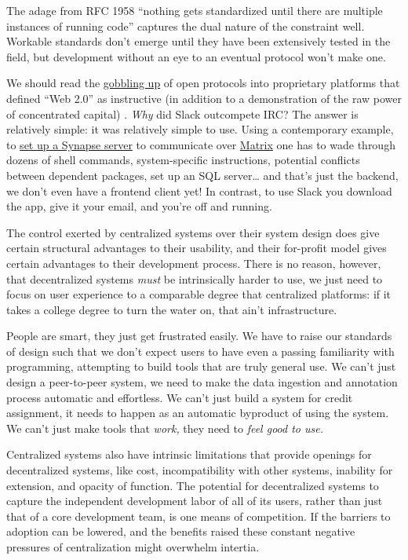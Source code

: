 \documentclass[10pt]{tufte-book}
\begin{document}
The adage from RFC 1958 ``nothing gets standardized until there are
multiple instances of running code'' \citep{carpenterRFC1958Architectural1996}  captures the dual nature of the
constraint well. Workable standards don't emerge until they have been
extensively tested in the field, but development without an eye to an
eventual protocol won't make one.

We should read the
\href{https://en.wikipedia.org/wiki/Embrace,_extend,_and_extinguish}{gobbling
up} of open protocols into proprietary platforms that defined ``Web
2.0'' as instructive (in addition to a demonstration of the raw power of
concentrated capital) \citep{markoffTomorrowWorldWide1996} .
\emph{Why} did Slack outcompete IRC? The answer is relatively simple: it
was relatively simple to use. Using a contemporary example, to
\href{https://matrix-org.github.io/synapse/latest/setup/installation.html}{set
up a Synapse server} to communicate over
\href{https://matrix.org/docs/spec/}{Matrix} one has to wade through
dozens of shell commands, system-specific instructions, potential
conflicts between dependent packages, set up an SQL server\ldots{} and
that's just the backend, we don't even have a frontend client yet! In
contrast, to use Slack you download the app, give it your email, and
you're off and running.

The control exerted by centralized systems over their system design does
give certain structural advantages to their usability, and their
for-profit model gives certain advantages to their development process.
There is no reason, however, that decentralized systems \emph{must} be
intrinsically harder to use, we just need to focus on user experience to
a comparable degree that centralized platforms: if it takes a college
degree to turn the water on, that ain't infrastructure.

People are smart, they just get frustrated easily. We have to raise our
standards of design such that we don't expect users to have even a
passing familiarity with programming, attempting to build tools that are
truly general use. We can't just design a peer-to-peer system, we need
to make the data ingestion and annotation process automatic and
effortless. We can't just build a system for credit assignment, it needs
to happen as an automatic byproduct of using the system. We can't just
make tools that \emph{work,} they need to \emph{feel good to use.}

Centralized systems also have intrinsic limitations that provide
openings for decentralized systems, like cost, incompatibility with
other systems, inability for extension, and opacity of function. The
potential for decentralized systems to capture the independent
development labor of all of its users, rather than just that of a core
development team, is one means of competition. If the barriers to
adoption can be lowered, and the benefits raised these constant negative
pressures of centralization might overwhelm intertia.
\end{document}
